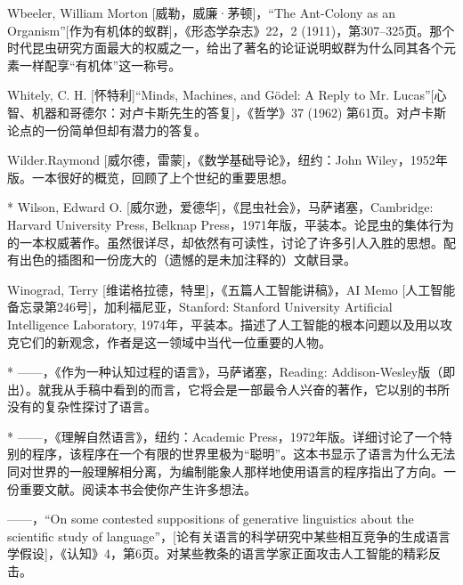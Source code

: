 \begin{thebib}
\begin{biblist}
\item Wbeeler, William Morton [威勒，威廉·茅顿]，“The Ant-Colony as an Organism”[作为有机体的蚁群]，《形态学杂志》22，2 (1911)，第307--325页。那个时代昆虫研究方面最大的权威之一，给出了著名的论证说明蚁群为什么同其各个元素一样配享“有机体”这一称号。

\item Whitely, C. H. [怀特利]“Minds, Machines, and Gödel: A Reply to Mr. Lucas”[心智、机器和哥德尔：对卢卡斯先生的答复]，《哲学》37 (1962) 第61页。对卢卡斯论点的一份简单但却有潜力的答复。

\item Wilder.Raymond [威尔德，雷蒙]，《数学基础导论》，纽约：John Wiley，1952年版。一本很好的概览，回顾了上个世纪的重要思想。

\item[*] Wilson, Edward O. [威尔逊，爱德华]，《昆虫社会》，马萨诸塞，Cambridge: Harvard University Press, Belknap Press，1971年版，平装本。论昆虫的集体行为的一本权威著作。虽然很详尽，却依然有可读性，讨论了许多引人入胜的思想。配有出色的插图和一份庞大的（遗憾的是未加注释的）文献目录。

\item Winograd, Terry [维诺格拉德，特里]，《五篇人工智能讲稿》，AI Memo [人工智能备忘录第246号]，加利福尼亚，Stanford: Stanford University Artificial Intelligence Laboratory, 1974年，平装本。描述了人工智能的根本问题以及用以攻克它们的新观念，作者是这一领域中当代一位重要的人物。

\item[*]——，《作为一种认知过程的语言》，马萨诸塞，Reading: Addison-Wesley版（即出）。就我从手稿中看到的而言，它将会是一部最令人兴奋的著作，它以别的书所没有的复杂性探讨了语言。

\item[*]——，《理解自然语言》，纽约：Academic Press，1972年版。详细讨论了一个特别的程序，该程序在一个有限的世界里极为“聪明”。这本书显示了语言为什么无法同对世界的一般理解相分离，为编制能象人那样地使用语言的程序指出了方向。一份重要文献。阅读本书会使你产生许多想法。

\item ——，“On some contested suppositions of generative linguistics about the scientific study of language”，[论有关语言的科学研究中某些相互竞争的生成语言学假设]，《认知》4，第6页。对某些教条的语言学家正面攻击人工智能的精彩反击。


\end{biblist}
\end{thebib}
